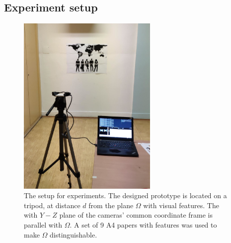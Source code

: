 \subsection{Experiment setup}
\label{sec:eval_setup}

\begin{figure}[ht]
    \centering
    \includegraphics[width=0.6\textwidth]{graphics/experiment_setup.png}
    \caption[The setup for experiments]{The setup for experiments. 
    The designed prototype is located on a tripod, at distance $d$ from the plane $\Omega$ with visual features.
    The with $Y-Z$ plane of the cameras' common coordinate frame is parallel with $\Omega$. 
    A set of 9 A4 papers with features was used to make $\Omega$ distinguishable.}
    \label{fig:exp_process}
\end{figure}


